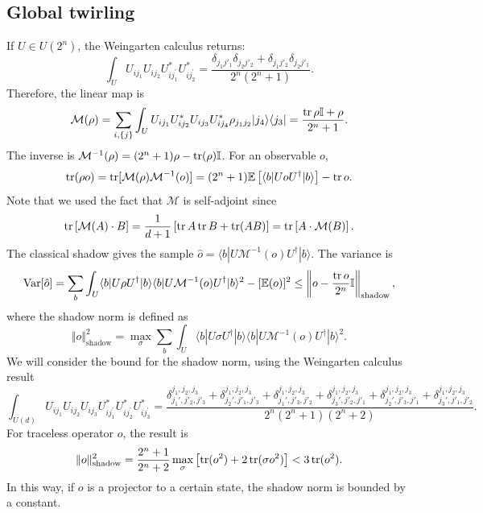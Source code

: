 \documentclass{SciPost}
\begin{document}
\subsection{Global twirling}
If $U \in U(2^n)$, the Weingarten calculus returns:
\begin{equation}
	\int_{U} U_{i j_1} U_{i j_2} U_{i j_1^{\prime}}^* U_{i j_2^{\prime}}^* 
	= \frac{\delta_{j_1 j'_1}\delta_{j_2 j'_2} + 
		\delta_{j_1 j'_2}\delta_{j_2 j'_1}}{2^n(2^n+1)}.
\end{equation}
Therefore, the linear map is
\begin{equation}
	\mathcal{M}(\rho) 
= \sum_{i,\{j\}} \int_{U}  U_{i j_1}U^*_{i j_2} U_{i j_3}U^*_{i j_4}  \rho_{j_1j_2} |j_4\rangle\langle j_3| 
= \frac{\operatorname{tr}\rho\mathbb I+\rho}{2^n+1}.
\end{equation}
The inverse is $\mathcal{M}^{-1}(\rho) = (2^n+1)\rho - \operatorname{tr}(\rho)\mathbb{I}$.
For an observable $o$,
\begin{equation}
	\operatorname{tr}(\rho o) = \operatorname{tr}[\mathcal{M}(\rho)\mathcal{M}^{-1}(o)]
	= (2^n+1)\mathbb{E}\left[\langle b| U o U^\dagger |b\rangle\right] - \operatorname{tr} o.
\end{equation}
Note that we used the fact that $\mathcal M$ is self-adjoint since
\begin{equation*}
	\operatorname{tr}\left[\mathcal{M}(A)\cdot B\right] 
	= \frac{1}{d+1}\left[\operatorname{tr} A \operatorname{tr} B + \operatorname{tr}(AB)\right]
	= \operatorname{tr}\left[A\cdot\mathcal{M}(B)\right].
\end{equation*}
The classical shadow gives the sample $\hat o = \langle b|U \mathcal{M}^{-1}(o) U^\dagger|b\rangle$. The variance is
\begin{equation}
	\operatorname{Var}[\hat o] = \sum_b \int_U \langle b|U \rho U^\dagger|b\rangle 
	\langle b|U \mathcal{M}^{-1}(o) U^\dagger|b\rangle^2-[\mathbb{E}(o)]^2
	\le \left\Vert o - \frac{\operatorname{tr} o}{2^n}\mathbb I \right\Vert_\text{shadow},
\end{equation}
where the shadow norm is defined as
\begin{equation}
	\Vert o \Vert_\text{shadow}^2 = \max_{\sigma}\sum_b \int_U \langle b|U \sigma U^\dagger|b\rangle \langle b|U \mathcal{M}^{-1}(o) U^\dagger|b\rangle^2.
\end{equation}
We will consider the bound for the shadow norm, using the Weingarten calculus result
\begin{equation}
	\int_{U(d)} U_{i j_1} U_{i j_2}U_{i j_3} U_{i j_1^{\prime}}^* U_{i j_2^{\prime}}^* U_{i j_3^{\prime}}^* 
	= \frac{
	\delta^{j_1,j_2,j_3}_{j_1',j'_2,j'_3} + \delta^{j_1,j_2,j_3}_{j_2',j'_1,j'_3} +
	\delta^{j_1,j_2,j_3}_{j_1',j'_3,j'_2} + \delta^{j_1,j_2,j_3}_{j_3',j'_2,j'_1} +
	\delta^{j_1,j_2,j_3}_{j_2',j'_3,j'_1} +	\delta^{j_1,j_2,j_3}_{j_3',j'_1,j'_2}
	}{2^n(2^n+1)(2^n+2)}.
\end{equation}
For traceless operator $o$, the result is
\begin{equation}
	\Vert o \Vert_\text{shadow}^2 = \frac{2^n+1}{2^n+2}\max_{\sigma} \left[\operatorname{tr}(o^2)+2 \operatorname{tr}(\sigma o^2) \right] < 3 \operatorname{tr}(o^2).
\end{equation}
In this way, if $o$ is a projector to a certain state, the shadow norm is bounded by a constant.
\end{document}
